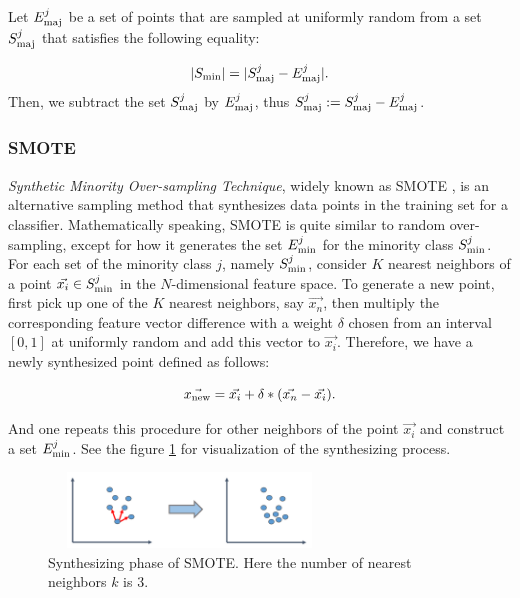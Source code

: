 Let $E_{\rm{maj}}^j$ be a set of points that are sampled at uniformly random from a set $S_{\rm{maj}}^{j}$ that satisfies the following equality:

	\begin{equation}
	|S_{\rm{min}}| = | S_{\rm{maj}}^j -  E_{\rm{maj}}^j |.
	\end{equation}
Then, we subtract the set $S_{\rm{maj}}^j$ by $E_{\rm{maj}}^j$, thus $S_{\rm{maj}}^j := S_{\rm{maj}}^j -  E_{\rm{maj}}^j$.
		
	\subsubsection*{SMOTE}
		\textit{Synthetic Minority Over-sampling Technique}, widely known as SMOTE \cite{SMOTE}, is an alternative sampling method that synthesizes data points in the training set for a classifier. Mathematically speaking, SMOTE is quite similar to random over-sampling, except for how it generates the set $E_{\rm{min}}^j$ for the minority class $S_{\rm{min}}^j$. For each set of the minority class $j$, namely $S_{\rm{min}}^j$, consider $K$ nearest neighbors of a point $\vec{x_i} \in S_{\rm{min}}^j$ in the $N$-dimensional feature space. To generate a new point, first pick up one of the $K$ nearest neighbors, say $\vec{x_{n}}$, then multiply the corresponding feature vector difference with a weight  $\delta$  chosen from an interval $ [0,1]$ at uniformly random and add this vector to $\vec{x_i}$. Therefore, we have a newly synthesized point defined as follows:
		
		\begin{equation}
		\vec{x_{\rm{new}}} = \vec{x_{i}} + \delta*(\vec{x_{n}} - \vec{x_{i}}).
		\end{equation}

And one repeats this procedure for other neighbors of the point $\vec{x_i}$ and construct a set $E_{\rm{min}}^j$. See the figure \ref{smote} for visualization of the synthesizing process.	
		
		\begin{figure}[ht]
		\begin{center}
		\vspace{0.5cm}
		\includegraphics[clip,width=7.5cm,height = 2cm]{figs/SMOTE.png}
		\vspace{0.5cm}
		\caption{Synthesizing phase of SMOTE. Here the number of nearest neighbors $k$ is 3.}
		\label{smote}
		\end{center}
		\end{figure}
		

